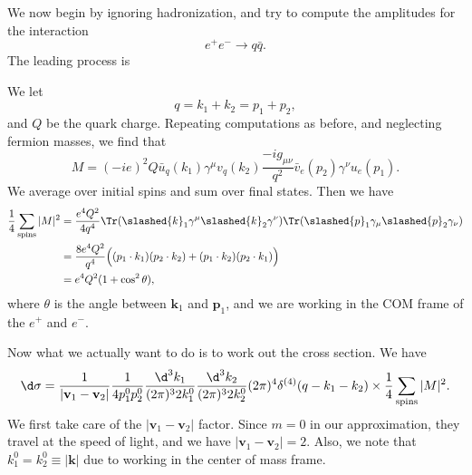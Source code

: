\documentclass[a4paper]{article}
\begin{document}
We now begin by ignoring hadronization, and try to compute the amplitudes for the interaction
\[
  e^+ e^- \to q\bar{q}.
\]
The leading process is
\begin{center}
\end{center}
We let
\[
  q = k_1 + k_2 = p_1 + p_2,
\]
and $Q$ be the quark charge. Repeating computations as before, and neglecting fermion masses, we find that
\[
  M = (-ie)^2 Q \bar{u}_q(k_1) \gamma^\mu v_q(k_2) \frac{-ig_{\mu\nu}}{q^2} \bar{v}_e (p_2) \gamma^\nu u_e(p_1).
\]
We average over initial spins and sum over final states. Then we have
\begin{align*}
  \frac{1}{4} \sum_{\mathrm{spins}} |M|^2 &= \frac{e^4 Q^2}{4 q^4} \Tr(\slashed{k}_1 \gamma^\mu \slashed{k}_2 \gamma^\nu) \Tr(\slashed{p}_1 \gamma_\mu \slashed{p}_2 \gamma_\nu)\\
  &= \frac{8 e^4 Q^2}{q^4} \Big((p_1 \cdot k_1) (p_2 \cdot k_2) + (p_1 \cdot k_2) (p_2 \cdot k_1)\Big)\\
  &= e^4 Q^2 (1 + \cos^2 \theta),
\end{align*}
where $\theta$ is the angle between $\mathbf{k}_1$ and $\mathbf{p}_1$, and we are working in the COM frame of the $e^+$ and $e^-$.

Now what we actually want to do is to work out the cross section. We have
\[
  \d \sigma = \frac{1}{|\mathbf{v}_1 - \mathbf{v}_2|} \frac{1}{4 p_1^0 p_2^0} \frac{\d^3 k_1}{ (2\pi)^3 2 k_1^0} \frac{\d^3 k_2}{(2\pi)^3 2 k_2^0} (2\pi)^4 \delta^{(4)} (q - k_1 - k_2) \times \frac{1}{4}\sum_{\mathrm{spins}} |M|^2.
\]
We first take care of the $|\mathbf{v}_1 - \mathbf{v}_2|$ factor. Since $m = 0$ in our approximation, they travel at the speed of light, and we have $|\mathbf{v}_1 - \mathbf{v}_2| = 2$. Also, we note that $k_1^0 = k_2^0 \equiv |\mathbf{k}|$ due to working in the center of mass frame.
\end{document}
